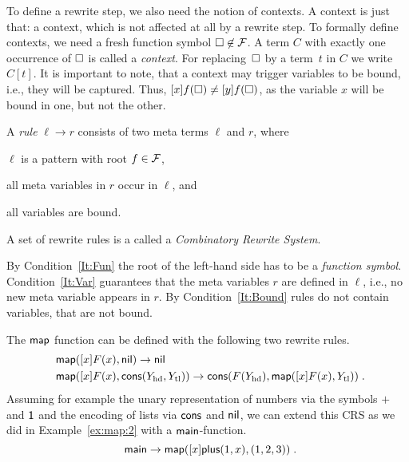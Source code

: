 To define a rewrite step, we also need the notion of contexts. A
context is just that: a context, which is not affected at all by a
rewrite step. To formally define contexts, we need a fresh function
symbol $\square \not\in \mathcal{F}$. A term $C$ with exactly one occurrence of
$\square$ is called a \emph{context}. For replacing~$\square$ by a
term~$t$ in $C$ we write $C[t]$. It is important to note, that a
context may trigger variables to be bound, i.e., they will be
captured. Thus, $[x] f(\square) \neq [y] f(\square)$, as the variable $x$
will be bound in one, but not the other.
%
\begin{definition} \label{def:rule} \label{def:rewritesystem} 
  A \emph{rule} $\ell \to r$ consists of two meta terms $\ell$ and
  $r$, where
  \begin{enumerate*} [label=\itshape(\roman*)]
  \item \label{It:Fun}   $\ell$ is a pattern with root $f \in \mathcal{F}$,
  \item \label{It:Var}   all meta variables in $r$ occur in $\ell$, and 
  \item \label{It:Bound} all variables are bound. 
  \end{enumerate*}
  A set of rewrite rules is a called a
  \emph{Combinatory Rewrite System}. 
\end{definition}
%
By Condition~\ref{It:Fun} the root of the left-hand side has to be a
\emph{function symbol}.
%
Condition~\ref{It:Var} guarantees that the meta variables $r$ are
defined in $\ell$, i.e., no new meta variable appears in
$r$. By Condition~\ref{It:Bound} rules do not contain variables, that are not
bound.
%
\begin{example} \label{ex:rules} %
  The $\mathsf{map}$ function can be defined with the following two rewrite
  rules.
  \begin{align*}
    & \map([x] F(x), \nil)  \to \nil \\
    & \map([x] F(x), \cons(\Yhd,\Ytl)) 
      \to \cons(F(\Yhd), \map([x]F(x), \Ytl))
      \tpkt
  \end{align*}
  Assuming for example the unary representation of numbers via the symbols
  $\plus$ and $\mathsf{1}$ 
  and the encoding of lists via $\mathsf{cons}$ and $\mathsf{nil}$, 
  we can extend this CRS as we did in
  Example~\ref{ex:map:2} with a $\mathsf{main}$-function.
  \begin{equation*}
    \main \to \map ([x] \plus(1,x), (1,2,3))
    \tpkt
  \end{equation*}
\end{example}

